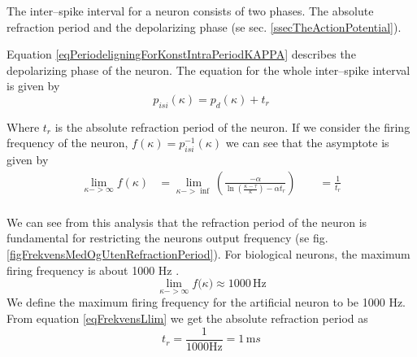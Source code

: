 

The inter--spike interval for a neuron consists of two phases. 
The absolute refraction period and the depolarizing phase (se sec. \ref{ssecTheActionPotential}).

Equation \eqref{eqPeriodeligningForKonstIntraPeriodKAPPA} describes the depolarizing phase of the neuron. %
The equation for the whole inter--spike interval is given by
\begin{equation}
	p_{isi}(\kappa) = p_d(\kappa) + t_r
	\label{eqHeilePerioden}
\end{equation}

Where $t_r$ is the absolute refraction period of the neuron. %
If we consider the firing frequency of the neuron, $f(\kappa) = p_{isi}^{-1}(\kappa)$ we can see that the asymptote is given by
\begin{equation}
	\begin{split}
		\lim_{\kappa->\infty}{ f(\kappa)} &= \lim_{\kappa->\inf}\left( \frac{-\alpha}{\ln \left( \frac{\kappa - \tau}{\kappa} \right) - \alpha t_r} \right)   \qquad = \frac{1}{t_r} \\ 
	\end{split}
	\label{eqFrekvensLlim} %
\end{equation}




We can see from this analysis that the refraction period of the neuron is fundamental for restricting the neurons output frequency (se fig. \ref{figFrekvensMedOgUtenRefractionPeriod}).
For biological neurons, the maximum firing frequency is about 1000 Hz \cite{NeuroscienceExploringTheBrain3edKAP4}. %
\begin{equation}
	\lim_{\kappa->\infty}{ f(\kappa}) \approx 1000 \, \text{Hz}
\end{equation}
We define the maximum firing frequency for the artificial neuron to be 1000 Hz. From equation \ref{eqFrekvensLlim} we get the absolute refraction period as
\begin{equation}
	t_r = \frac{1}{1000 \text{Hz}} = 1 \, \text{m}s %
\end{equation}

